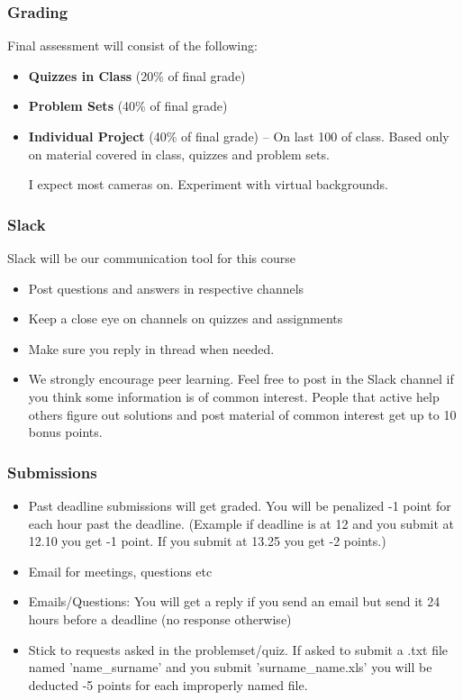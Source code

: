 \documentclass[compress, aspectratio=54]{beamer}
\begin{document}


\begin{frame}
\frametitle{Grading}
Final assessment will consist of the following:
\begin{itemize}
\item \textbf{Quizzes in Class} (20\% of final grade)
\item \textbf{Problem Sets} (40\% of final grade)
\item \textbf{Individual Project}  (40\% of final grade) -- On last 100 of class. Based only on material covered in class, quizzes and problem sets.

I expect most cameras on. Experiment with virtual backgrounds.
\end{itemize}
\end{frame}




\begin{frame}
\frametitle{Slack}
Slack will be our communication tool for this course
\begin{itemize}
\item Post questions and answers in respective channels
\item Keep a close eye on channels on quizzes and assignments
\item Make sure you reply in thread when needed.
\item We strongly encourage peer learning. Feel free to post in the Slack channel if you think some information is of common interest.  People that active help others figure out solutions  and post material of common interest get up to 10 bonus points. 
\end{itemize}
\end{frame}



\begin{frame}
\frametitle{Submissions}

\begin{itemize}
\item Past deadline submissions will get graded. You will be penalized -1 point for each hour past the deadline. (Example if deadline is at 12 and you submit at 12.10 you get -1 point. If you submit at 13.25 you get -2 points.)
\item Email for meetings, questions etc 
\item Emails/Questions: You will get a reply if you send an email but send it 24 hours before a deadline (no response otherwise)
\item  Stick to requests asked in the problemset/quiz. If asked to submit a .txt file named 'name\_surname'  and you submit 'surname\_name.xls' you will be deducted -5 points for each improperly named file.
\end{itemize}

\end{frame}
\end{document}
